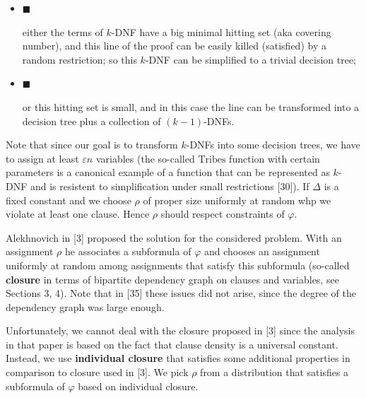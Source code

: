 \begin{itemize}


\item[] 
$\blacksquare$ 


either the terms of $k$-DNF have a big minimal hitting set (aka covering number), and this
line of the proof can
be easily killed (satisfied) by a random restriction; so this $k$-DNF can be simplified to a
trivial decision tree;\par





\item[] 
$\blacksquare$ 


or this hitting set is small, and in this case the line can be transformed into a decision tree
plus a collection of $(k-1)$-DNFs.\par





\end{itemize}




Note that since our goal is to transform $k$-DNFs into some decision trees, we have to assign at least
$\varepsilon n$ variables (the so-called $\mathrm{Tribes}$ function with certain parameters is a canonical
example of a function that can be represented as $k$-DNF and is resistent to simplification under small
restrictions [30]). If $\Delta$ is a fixed constant and we choose $\rho$ of proper size
uniformly at random whp we violate at least one clause. Hence $\rho$ should respect constraints of
$\varphi$.\par




Alekhnovich in [3] proposed the solution for the considered problem. With an assignment
$\rho$ he associates a subformula of $\varphi$ and chooses an assignment uniformly at random among
assignments that satisfy this subformula (so-called \textbf{closure} in terms of bipartite dependency graph
on clauses and variables,
see Sections 3, 4). Note that in
[35] these issues did not arise, since the degree of the dependency graph was
large enough.\par




Unfortunately, we cannot deal with the closure proposed in [3] since the analysis in that
paper is based on the fact that clause density is a universal constant. Instead, we use
\textbf{individual closure} that satisfies some additional properties in comparison to closure used in
[3]. We pick $\rho$ from a distribution that satisfies a subformula of $\varphi$ based on
individual closure.\par




